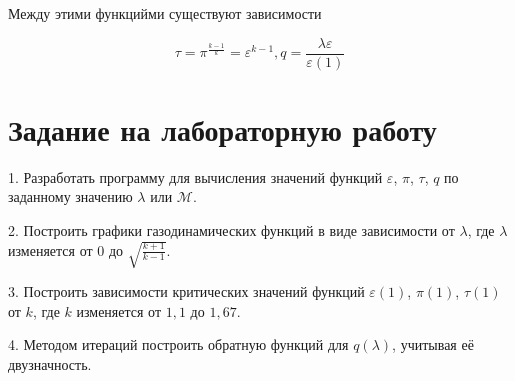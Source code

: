 \documentclass[12pt,a4paper,oneside]{book}
\newcommand*\Mach{\mathcal{M}}
\newcommand*\eps{\varepsilon}
\begin{document}
  Между этими функцийми существуют зависимости
  
  \begin{equation*}
    \tau = \pi^{\frac{k - 1}{k}} = \eps^{k - 1},
    q = \frac{\lambda \eps}{\eps (1)}
  \end{equation*}
  
  \section*{Задание на лабораторную работу}
  
  1. Разработать программу для вычисления значений функций $\eps$, $\pi$,
  $\tau$, $q$ по заданному значению $\lambda$ или $\Mach$.
  
  2. Построить графики газодинамических функций в виде зависимости от $\lambda$,
  где $\lambda$ изменяется от $0$ до $\sqrt{\frac{k + 1}{k - 1}}$.
  
  3. Построить зависимости критических значений функций $\eps(1)$, $\pi(1)$,
  $\tau(1)$ от $k$, где $k$ изменяется от $1,1$ до $1,67$.
  
  4. Методом итераций построить обратную функций для $q(\lambda)$, учитывая
  её двузначность.
  
\end{document}

